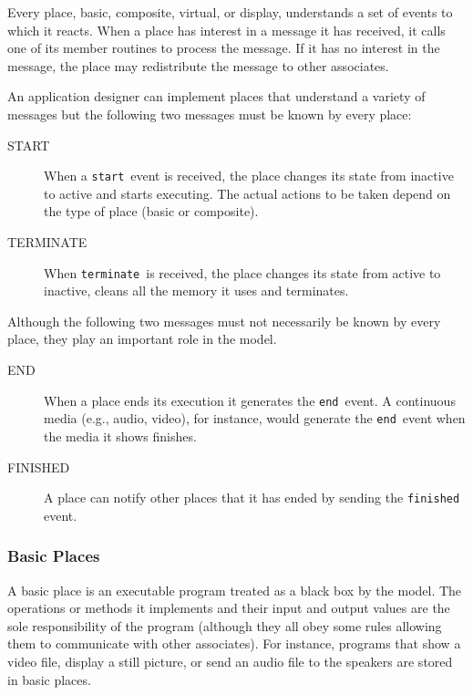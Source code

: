 \documentclass[twocolumn,10pt]{article}
\newcommand{\term}{{\tt terminate}}
\newcommand{\theEnd}{{\tt end}}
\newcommand{\start}{{\tt start}}
\newcommand{\termRep}{TERMINATE}
\newcommand{\theEndRep}{END}
\newcommand{\startRep}{START}
\begin{document}
Every place, basic, composite, virtual, or display, understands a set
of events to which it reacts.  When a place has interest in a message
it has received, it calls one of its member routines to process the
message.  If it has no interest in the message, the place may
redistribute the message to other associates.  %

An application designer can implement places that understand a variety
of messages but the following two messages must be known by every
place:

\begin{description}
  \item [\startRep] When a \start\ event is received, the place changes
        its state from inactive to active and starts executing.  The
        actual actions to be taken depend on the type of place (basic or
        composite).
  \item [\termRep] When \term\ is received, the place changes its state
        from active to inactive,  cleans all the memory it uses and
        terminates.
\end{description}

Although the following two messages must not necessarily be known by
every place, they play an important role in the model.

\begin{description}
  \item [\theEndRep] When a place ends its execution it generates the
        \theEnd\ event.  A continuous media  (e.g., audio, video), for
        instance, would generate the \theEnd\ event when the media it shows
        finishes.  %
  \item [FINISHED] A place can notify
	other places that it has ended by sending the {\tt finished} event.
\end{description}

\subsubsection*{Basic Places}

A basic place is an executable program treated as a black box by the
model.  The operations or methods it implements and their input
and output values are the sole responsibility of the program (although
they all obey some rules allowing them to communicate with other
associates).  For instance, programs that show a video file, display a
still picture, or send an audio file to the speakers are stored in
basic places.
\end{document}

